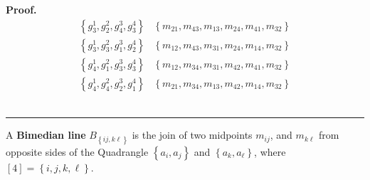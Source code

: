 \documentclass{unswthesis}
\newenvironment{proof}[1][Proof]{\noindent\textbf{#1.} }{\ \rule{0.5em}{0.5em}}
\begin{document}
\begin{proof}
\begin{equation*}
\begin{array}{cc}
\left\{ g_{3}^{1},g_{2}^{2},g_{4}^{3},g_{3}^{4}\right\} & \left\{
m_{21},m_{43},m_{13},m_{24},m_{41},m_{32}\right\} \\ 
\left\{ g_{3}^{1},g_{3}^{2},g_{1}^{3},g_{2}^{4}\right\} & \left\{
m_{12},m_{43},m_{31},m_{24},m_{14},m_{32}\right\} \\ 
\left\{ g_{4}^{1},g_{1}^{2},g_{3}^{3},g_{3}^{4}\right\} & \left\{
m_{12},m_{34},m_{31},m_{42},m_{41},m_{32}\right\} \\ 
\left\{ g_{4}^{1},g_{4}^{2},g_{2}^{3},g_{1}^{4}\right\} & \left\{
m_{21},m_{34},m_{13},m_{42},m_{14},m_{32}\right\}%
\end{array}%
\end{equation*}
\end{proof}

\bigskip

A \textbf{Bimedian line} $B_{\left\{ ij,k\ell \right\} }$ is the join of two
midpoints $m_{ij}$, and $m_{k\ell }$ from opposite sides of the Quadrangle $%
\left\{ a_{i},a_{j}\right\} $ and $\left\{ a_{k},a_{\ell }\right\} $, where $%
\left[ 4\right] =\left\{ i,j,k,\ell \right\} $.
\end{document}

